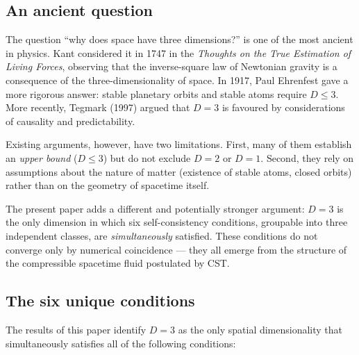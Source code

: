 \documentclass[10pt,a4paper]{article}
\begin{document}
\subsection{An ancient question}

The question ``why does space have three dimensions?'' is one of the most ancient in physics. Kant considered it in 1747 in the \textit{Thoughts on the True Estimation of Living Forces}, observing that the inverse-square law of Newtonian gravity is a consequence of the three-dimensionality of space. In 1917, Paul Ehrenfest \cite{Ehrenfest1917} gave a more rigorous answer: stable planetary orbits and stable atoms require $D \leq 3$. More recently, Tegmark (1997) \cite{Tegmark1997} argued that $D = 3$ is favoured by considerations of causality and predictability.

Existing arguments, however, have two limitations. First, many of them establish an \textit{upper bound} ($D \leq 3$) but do not exclude $D = 2$ or $D = 1$. Second, they rely on assumptions about the nature of matter (existence of stable atoms, closed orbits) rather than on the geometry of spacetime itself.

The present paper adds a different and potentially stronger argument: $D = 3$ is the only dimension in which six self-consistency conditions, groupable into three independent classes, are \textit{simultaneously} satisfied. These conditions do not converge only by numerical coincidence --- they all emerge from the structure of the compressible spacetime fluid postulated by CST.

\subsection{The six unique conditions}

The results of this paper identify $D = 3$ as the only spatial dimensionality that simultaneously satisfies all of the following conditions:
\end{document}
